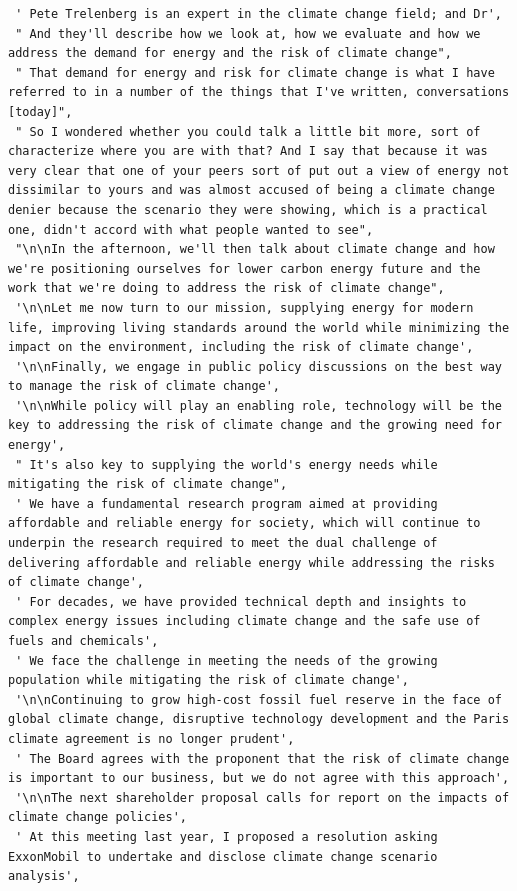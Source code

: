 \documentclass[
  letterpaper,
  DIV=11,
  numbers=noendperiod]{scrreprt}
\begin{document}
\begin{verbatim}
 ' Pete Trelenberg is an expert in the climate change field; and Dr',
 " And they'll describe how we look at, how we evaluate and how we address the demand for energy and the risk of climate change",
 " That demand for energy and risk for climate change is what I have referred to in a number of the things that I've written, conversations [today]",
 " So I wondered whether you could talk a little bit more, sort of characterize where you are with that? And I say that because it was very clear that one of your peers sort of put out a view of energy not dissimilar to yours and was almost accused of being a climate change denier because the scenario they were showing, which is a practical one, didn't accord with what people wanted to see",
 "\n\nIn the afternoon, we'll then talk about climate change and how we're positioning ourselves for lower carbon energy future and the work that we're doing to address the risk of climate change",
 '\n\nLet me now turn to our mission, supplying energy for modern life, improving living standards around the world while minimizing the impact on the environment, including the risk of climate change',
 '\n\nFinally, we engage in public policy discussions on the best way to manage the risk of climate change',
 '\n\nWhile policy will play an enabling role, technology will be the key to addressing the risk of climate change and the growing need for energy',
 " It's also key to supplying the world's energy needs while mitigating the risk of climate change",
 ' We have a fundamental research program aimed at providing affordable and reliable energy for society, which will continue to underpin the research required to meet the dual challenge of delivering affordable and reliable energy while addressing the risks of climate change',
 ' For decades, we have provided technical depth and insights to complex energy issues including climate change and the safe use of fuels and chemicals',
 ' We face the challenge in meeting the needs of the growing population while mitigating the risk of climate change',
 '\n\nContinuing to grow high-cost fossil fuel reserve in the face of global climate change, disruptive technology development and the Paris climate agreement is no longer prudent',
 ' The Board agrees with the proponent that the risk of climate change is important to our business, but we do not agree with this approach',
 '\n\nThe next shareholder proposal calls for report on the impacts of climate change policies',
 ' At this meeting last year, I proposed a resolution asking ExxonMobil to undertake and disclose climate change scenario analysis',

\end{verbatim}
\end{document}
